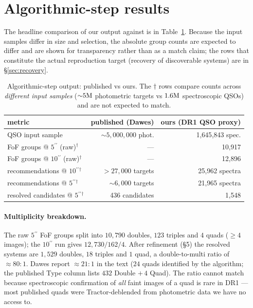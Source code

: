 \documentclass[11pt,letterpaper]{article}
\newcommand{\asec}{\ensuremath{^{\prime\prime}}}
\begin{document}
\section{Algorithmic-step results}

The headline comparison of our output against \citet{dawes2023quasars} is
in Table~\ref{tab:headline}. Because the input samples differ in size and
selection, the absolute group counts are expected to differ and are shown
for transparency rather than as a match claim; the rows that constitute the
actual reproduction target (recovery of discoverable systems) are in
\S\ref{sec:recovery}.

\begin{table}[ht]
\centering
\caption{Algorithmic-step output: published vs ours. The
$\dagger$ rows compare counts across \emph{different input samples}
(${\sim}5{\rm M}$ photometric targets vs $1.6{\rm M}$ spectroscopic QSOs)
and are not expected to match.}
\label{tab:headline}
\small
\begin{tabular}{lrr}
\toprule
metric & published (Dawes) & ours (DR1 QSO proxy) \\
\midrule
QSO input sample                          & ${\sim}5{,}000{,}000$ phot. & 1{,}645{,}843 spec. \\
FoF groups @ $5\asec$ (raw)$^\dagger$    & ---                   & 10{,}917 \\
FoF groups @ $10\asec$ (raw)$^\dagger$   & ---                   & 12{,}896 \\
recommendations @ $10\asec$$^\dagger$    & ${>}27{,}000$ targets & 25{,}962 spectra \\
recommendations @ $5\asec$$^\dagger$     & ${\sim}6{,}000$ targets & 21{,}965 spectra \\
resolved candidates @ $5\asec$$^\dagger$ & 436 candidates        & 1{,}548 \\
\bottomrule
\end{tabular}
\end{table}

\paragraph{Multiplicity breakdown.} The raw $5\asec$ FoF groups split into
$10{,}790$ doubles, $123$ triples and $4$ quads ($\geq 4$ images); the
$10\asec$ run gives $12{,}730/162/4$. After refinement (\S5) the
resolved systems are $1{,}529$ doubles, $18$ triples and $1$ quad, a
double-to-multi ratio of ${\approx}80{:}1$. Dawes report
${\approx}21{:}1$ in the text ($24$ quads identified by the algorithm; the
published Type column lists $432$ Double $+\,4$ Quad). The ratio cannot
match because spectroscopic confirmation of \emph{all} faint images of a
quad is rare in DR1 --- most published quads were Tractor-deblended from
photometric data we have no access to.
\end{document}
